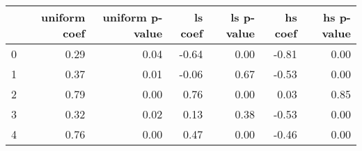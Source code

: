 \begin{tabular}{lrrrrrr}
\toprule
 & uniform coef & uniform p-value & ls coef & ls p-value & hs coef & hs p-value \\
\midrule
0 & 0.29 & 0.04 & -0.64 & 0.00 & -0.81 & 0.00 \\
1 & 0.37 & 0.01 & -0.06 & 0.67 & -0.53 & 0.00 \\
2 & 0.79 & 0.00 & 0.76 & 0.00 & 0.03 & 0.85 \\
3 & 0.32 & 0.02 & 0.13 & 0.38 & -0.53 & 0.00 \\
4 & 0.76 & 0.00 & 0.47 & 0.00 & -0.46 & 0.00 \\
\bottomrule
\end{tabular}
